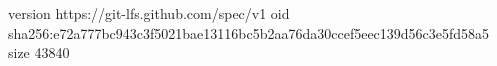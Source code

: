 version https://git-lfs.github.com/spec/v1
oid sha256:e72a777bc943c3f5021bae13116bc5b2aa76da30ccef5eec139d56c3e5fd58a5
size 43840
